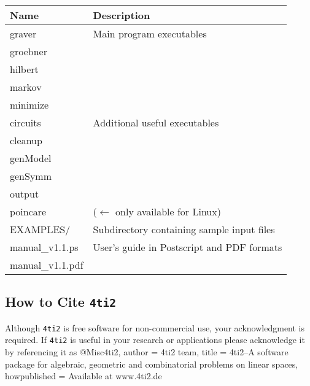 \documentclass[12pt]{article}
\newenvironment{myverbatim}%
  {\quote\verbatim}%
  {\endverbatim\endquote}
\theoremstyle{definition}
\newcommand{\FourTiTwo}{{\tt 4ti2}}
\begin{document}
\begin{tabular}{|l|l|}
\hline
Name & Description\\
\hline 
graver & Main program executables\\
groebner & \\
hilbert & \\
markov & \\
minimize & \\
\hline
circuits & Additional useful executables\\
cleanup & \\
genModel & \\
genSymm & \\
output & \\
poincare & ($\gets$ only available for Linux)\\ 
\hline
EXAMPLES/ & Subdirectory containing sample input files\\
\hline
manual\_v1.1.ps & User's guide in Postscript and PDF formats\\
manual\_v1.1.pdf & \\
\hline 
\end{tabular}






\subsection{How to Cite \FourTiTwo{}}

Although \FourTiTwo{} is free software for non-commercial use, your
acknowledgment is required. If \FourTiTwo{} is useful in your research
or applications please acknowledge it by referencing it as 
\begin{myverbatim}
@Misc{4ti2,
  author = {4ti2 team},
  title  = {4ti2--A software package for algebraic, geometric
            and combinatorial problems on linear spaces},
  howpublished = {Available at www.4ti2.de}
}
\end{myverbatim}
\end{document}
